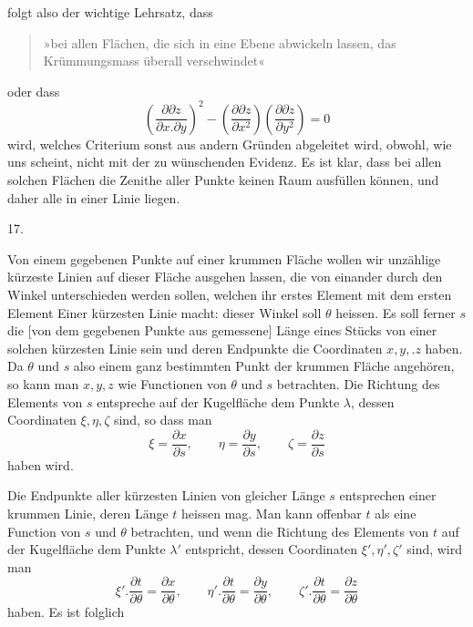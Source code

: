 %
folgt also der wichtige Lehrsatz, dass
\begin{quote}
»bei allen Flächen, die sich in eine Ebene abwickeln lassen, das Krümmungsmass überall verschwindet«
\end{quote}
\noindent oder dass
\[
\left(\frac{\partial\partial z}{\partial x.\partial y}\right)^{2}-\left(\frac{\partial\partial z}{\partial x^{2}}\right)\left(\frac{\partial\partial z}{\partial y^{2}}\right)=0
\]
wird, welches Criterium sonst aus andern Gründen abgeleitet wird, obwohl, wie uns scheint, nicht mit der zu wünschenden Evidenz. Es ist klar, dass bei allen solchen Flächen die Zenithe aller Punkte keinen Raum ausfüllen können, und daher alle in einer Linie liegen.

\begin{center}17.\end{center}
\noindent\hspace*{1.2em}Von einem gegebenen Punkte auf einer krummen Fläche wollen wir unzählige kürzeste Linien auf dieser Fläche ausgehen lassen, die von einander durch den Winkel unterschieden werden sollen, welchen ihr erstes Element mit dem ersten Element Einer  kürzesten Linie macht: dieser Winkel soll $\theta$ heissen. Es soll ferner $s$ die [von dem gegebenen Punkte aus gemessene] Länge eines Stücks von einer solchen kürzesten Linie sein und deren Endpunkte die Coordinaten $x,y,.z$ haben. Da $\theta$ und $s$ also einem ganz bestimmten Punkt der krummen Fläche angehören, so kann man $x,y,z$ wie Functionen von $\theta$ und $s$ betrachten. Die Richtung des Elements von $s$ entspreche auf der Kugelfläche dem Punkte $\lambda$, dessen Coordinaten $\xi,\eta,\zeta$ sind, so dass man
\[
\xi=\frac{\partial x}{\partial s},\qquad\eta=\frac{\partial y}{\partial s},\qquad\zeta=\frac{\partial z}{\partial s}
\]
haben wird.

Die Endpunkte aller kürzesten Linien von gleicher Länge $s$ entsprechen einer krummen Linie, deren Länge $t$ heissen mag. Man kann offenbar $t$ als eine Function von $s$ und $\theta$ betrachten, und wenn die Richtung des Elements von $t$ auf der Kugelfläche dem Punkte $\lambda'$ entspricht, dessen Coordinaten $\xi',\eta',\zeta'$ sind, wird man
\[
\xi'.\frac{\partial t}{\partial\theta}=\frac{\partial x}{\partial\theta},\qquad\eta'.\frac{\partial t}{\partial\theta}=\frac{\partial y}{\partial\theta},\qquad\zeta'.\frac{\partial t}{\partial\theta}=\frac{\partial z}{\partial\theta}
\]
haben. Es ist folglich
